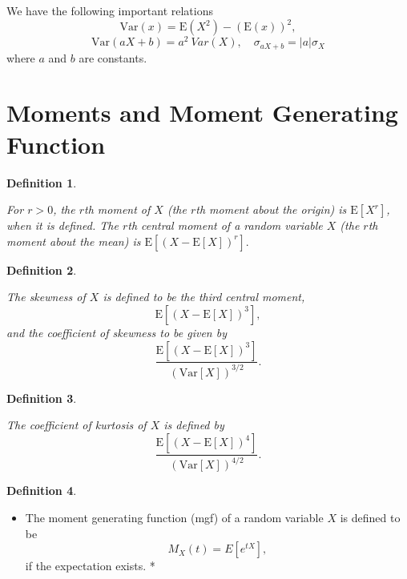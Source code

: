 \documentclass[
]{book}
\providecommand{\tightlist}{%
  \setlength{\itemsep}{0pt}\setlength{\parskip}{0pt}}
\theoremstyle{definition}
\newtheorem{definition}{Definition}[chapter]
\theoremstyle{definition}
\theoremstyle{definition}
\theoremstyle{definition}
\theoremstyle{remark}
\begin{document}
We have the following important relations
\[\mathrm{Var}(x) = \mathrm{E}(X^2) - (\mathrm{E}(x))^2 ,\]
\[\mathrm{Var}(aX + b) = a^2\ Var(X), \quad   \sigma_{aX + b}= |a|\sigma_X\]
where \(a\) and \(b\) are constants.

\hypertarget{moments-and-moment-generating-function}{%
\section{Moments and Moment Generating Function}\label{moments-and-moment-generating-function}}

\begin{definition}
\protect\hypertarget{def:unlabeled-div-12}{}\label{def:unlabeled-div-12}

\emph{For \(r > 0\), the \(r\)th moment of \(X\) (the \(r\)th
moment about the origin) is \(\mathrm{E}[X^r]\), when it is defined. The
\(r\)th central moment of a random variable \(X\) (the \(r\)th moment about
the mean) is \(\mathrm{E}[(X - \mathrm{E}[X])^r].\) }

\end{definition}

\begin{definition}
\protect\hypertarget{def:unlabeled-div-13}{}\label{def:unlabeled-div-13}

\emph{The skewness of \(X\) is defined to be the third
central moment, \[\mathrm{E}[(X - \mathrm{E}[X])^3],\] and the
coefficient of skewness to be given by
\[\frac{\mathrm{E}[(X - \mathrm{E}[X])^3]}{(\mathrm{Var}[X])^{3/2}}.\] }

\end{definition}

\begin{definition}
\protect\hypertarget{def:unlabeled-div-14}{}\label{def:unlabeled-div-14}

\emph{The coefficient of kurtosis of \(X\) is defined by
\[\frac{\mathrm{E}[(X - \mathrm{E}[X])^4]}{(\mathrm{Var}[X])^{4/2}}.\] }

\end{definition}

\begin{definition}
\protect\hypertarget{def:unlabeled-div-15}{}\label{def:unlabeled-div-15}

\begin{itemize}
\tightlist
\item
  The moment generating function (mgf) of a random
  variable \(X\) is defined to be \[M_X(t) = E[e^{tX}],\] if the expectation
  exists. *
\end{itemize}

\end{definition}
\end{document}
